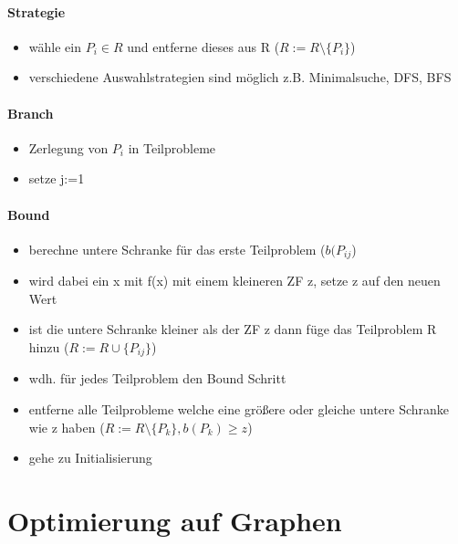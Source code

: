 \documentclass[12pt,a4paper, hyperref]{article}
\begin{document}
\paragraph{Strategie}
\begin{itemize}
\item wähle ein $P_i \in R$ und entferne dieses aus R ($R := R\setminus \{P_i\}$)
\item verschiedene Auswahlstrategien sind möglich z.B. Minimalsuche, DFS, BFS
\end{itemize}
\paragraph{Branch}
\begin{itemize}
\item Zerlegung von $P_i$ in Teilprobleme
\item setze j:=1
\end{itemize}
\paragraph{Bound}
\begin{itemize}
\item berechne untere Schranke für das erste Teilproblem ($b(P_{ij}$)
\item wird dabei ein x mit f(x) mit einem kleineren ZF z, setze z auf den neuen Wert
\item ist die untere Schranke kleiner als der ZF z dann füge das Teilproblem R hinzu ($R:=R \cup \{P_{ij}\}$)
\item wdh. für jedes Teilproblem den Bound Schritt
\item entferne alle Teilprobleme welche eine größere oder gleiche untere Schranke wie z haben ($R:=R \setminus \{P_k\}, b(P_k) \geq z$)
\item gehe zu Initialisierung
\end{itemize}

\section{Optimierung auf Graphen}
\end{document}

